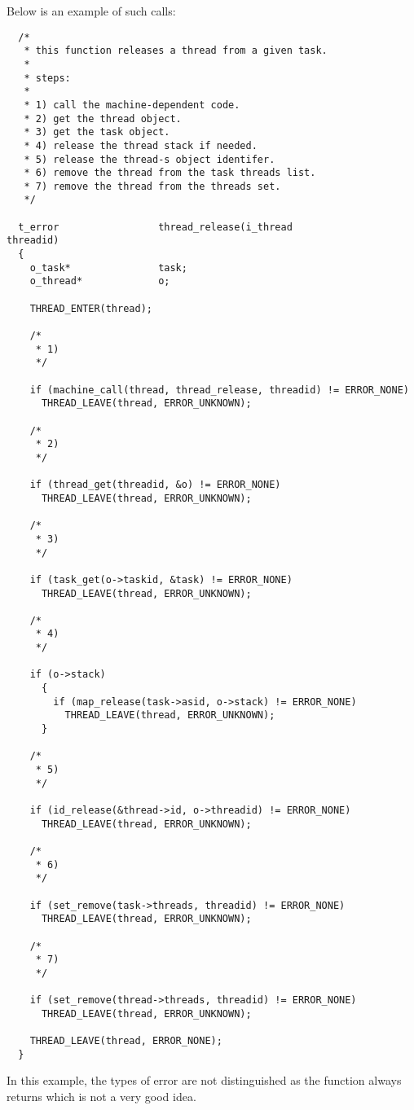 Below is an example of such calls:

\begin{verbatim}
  /*
   * this function releases a thread from a given task.
   *
   * steps:
   *
   * 1) call the machine-dependent code.
   * 2) get the thread object.
   * 3) get the task object.
   * 4) release the thread stack if needed.
   * 5) release the thread-s object identifer.
   * 6) remove the thread from the task threads list.
   * 7) remove the thread from the threads set.
   */

  t_error                 thread_release(i_thread                 threadid)
  {
    o_task*               task;
    o_thread*             o;

    THREAD_ENTER(thread);

    /*
     * 1)
     */

    if (machine_call(thread, thread_release, threadid) != ERROR_NONE)
      THREAD_LEAVE(thread, ERROR_UNKNOWN);

    /*
     * 2)
     */

    if (thread_get(threadid, &o) != ERROR_NONE)
      THREAD_LEAVE(thread, ERROR_UNKNOWN);

    /*
     * 3)
     */

    if (task_get(o->taskid, &task) != ERROR_NONE)
      THREAD_LEAVE(thread, ERROR_UNKNOWN);

    /*
     * 4)
     */

    if (o->stack)
      {
        if (map_release(task->asid, o->stack) != ERROR_NONE)
          THREAD_LEAVE(thread, ERROR_UNKNOWN);
      }

    /*
     * 5)
     */

    if (id_release(&thread->id, o->threadid) != ERROR_NONE)
      THREAD_LEAVE(thread, ERROR_UNKNOWN);

    /*
     * 6)
     */

    if (set_remove(task->threads, threadid) != ERROR_NONE)
      THREAD_LEAVE(thread, ERROR_UNKNOWN);

    /*
     * 7)
     */

    if (set_remove(thread->threads, threadid) != ERROR_NONE)
      THREAD_LEAVE(thread, ERROR_UNKNOWN);

    THREAD_LEAVE(thread, ERROR_NONE);
  }
\end{verbatim}

In this example, the types of error are not distinguished as the function
always returns  which is not a very good idea.
